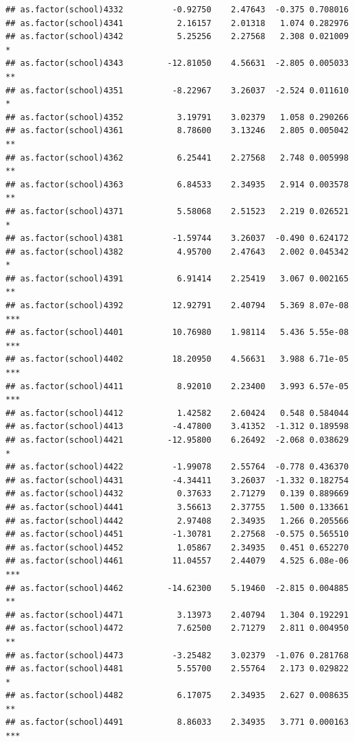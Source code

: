 \documentclass[ignorenonframetext,]{beamer}
\begin{document}
\begin{frame}[fragile]{}
\begin{verbatim}
## as.factor(school)4332          -0.92750    2.47643  -0.375 0.708016    
## as.factor(school)4341           2.16157    2.01318   1.074 0.282976    
## as.factor(school)4342           5.25256    2.27568   2.308 0.021009 *  
## as.factor(school)4343         -12.81050    4.56631  -2.805 0.005033 ** 
## as.factor(school)4351          -8.22967    3.26037  -2.524 0.011610 *  
## as.factor(school)4352           3.19791    3.02379   1.058 0.290266    
## as.factor(school)4361           8.78600    3.13246   2.805 0.005042 ** 
## as.factor(school)4362           6.25441    2.27568   2.748 0.005998 ** 
## as.factor(school)4363           6.84533    2.34935   2.914 0.003578 ** 
## as.factor(school)4371           5.58068    2.51523   2.219 0.026521 *  
## as.factor(school)4381          -1.59744    3.26037  -0.490 0.624172    
## as.factor(school)4382           4.95700    2.47643   2.002 0.045342 *  
## as.factor(school)4391           6.91414    2.25419   3.067 0.002165 ** 
## as.factor(school)4392          12.92791    2.40794   5.369 8.07e-08 ***
## as.factor(school)4401          10.76980    1.98114   5.436 5.55e-08 ***
## as.factor(school)4402          18.20950    4.56631   3.988 6.71e-05 ***
## as.factor(school)4411           8.92010    2.23400   3.993 6.57e-05 ***
## as.factor(school)4412           1.42582    2.60424   0.548 0.584044    
## as.factor(school)4413          -4.47800    3.41352  -1.312 0.189598    
## as.factor(school)4421         -12.95800    6.26492  -2.068 0.038629 *  
## as.factor(school)4422          -1.99078    2.55764  -0.778 0.436370    
## as.factor(school)4431          -4.34411    3.26037  -1.332 0.182754    
## as.factor(school)4432           0.37633    2.71279   0.139 0.889669    
## as.factor(school)4441           3.56613    2.37755   1.500 0.133661    
## as.factor(school)4442           2.97408    2.34935   1.266 0.205566    
## as.factor(school)4451          -1.30781    2.27568  -0.575 0.565510    
## as.factor(school)4452           1.05867    2.34935   0.451 0.652270    
## as.factor(school)4461          11.04557    2.44079   4.525 6.08e-06 ***
## as.factor(school)4462         -14.62300    5.19460  -2.815 0.004885 ** 
## as.factor(school)4471           3.13973    2.40794   1.304 0.192291    
## as.factor(school)4472           7.62500    2.71279   2.811 0.004950 ** 
## as.factor(school)4473          -3.25482    3.02379  -1.076 0.281768    
## as.factor(school)4481           5.55700    2.55764   2.173 0.029822 *  
## as.factor(school)4482           6.17075    2.34935   2.627 0.008635 ** 
## as.factor(school)4491           8.86033    2.34935   3.771 0.000163 ***

\end{verbatim}
\end{frame}
\end{document}
